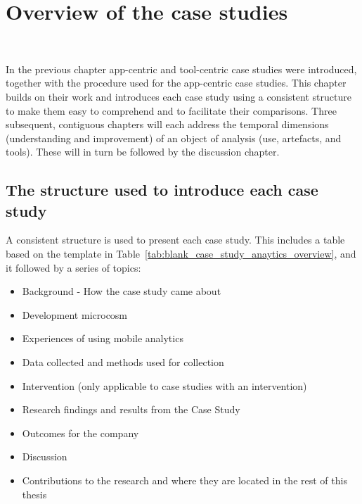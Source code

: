 \chapter{Overview of the case studies}~\label{chapter-case-studies-overview}

In the previous chapter app-centric and tool-centric case studies were introduced, together with the procedure used for the app-centric case studies. This chapter builds on their work and introduces each case study using a consistent structure to make them easy to comprehend and to facilitate their comparisons. Three subsequent, contiguous chapters will each address the temporal dimensions (understanding and improvement) of an object of analysis (use, artefacts, and tools). These will in turn be followed by the discussion chapter.


\section{The structure used to introduce each case study}
A consistent structure is used to present each case study. This includes a table based on the template in Table~\ref{tab:blank_case_study_anaytics_overview}, and it followed by a series of topics:
\begin{itemize}
    \itemsep0em
    \item Background - How the case study came about
    \item Development microcosm
    \item Experiences of using mobile analytics
    \item Data collected and methods used for collection
    \item Intervention (only applicable to case studies with an intervention)
    \item Research findings and results from the Case Study
    \item Outcomes for the company
    \item Discussion
    \item Contributions to the research and where they are located in the rest of this thesis
\end{itemize}


